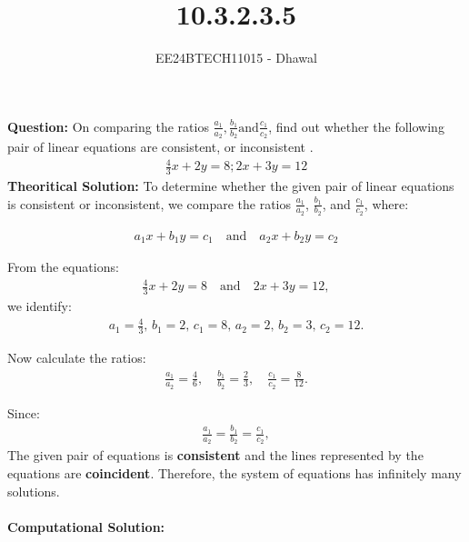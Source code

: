 \documentclass[journal]{IEEEtran}
\begin{document}

\vspace{3cm}

\title{10.3.2.3.5}
\author{EE24BTECH11015 - Dhawal}

{\let\newpage\relax\maketitle}

\renewcommand{\thefigure}{\theenumi}
\renewcommand{\thetable}{\theenumi}
\setlength{\intextsep}{10pt} %

\textbf{Question:}
	\newline
	On comparing the ratios $\frac{a_1}{a_2},\frac{b_1}{b_2} \text{and} \frac{c_1}{c_2}$, find out whether the following pair of linear equations are consistent, or inconsistent . 
	\begin{align}
		\frac{4}{3}x + 2y = 8 ; 2x + 3y = 12
	\end{align}
	\textbf{Theoritical Solution:}
	To determine whether the given pair of linear equations is consistent or inconsistent, we compare the ratios $\frac{a_1}{a_2}$, $\frac{b_1}{b_2}$, and $\frac{c_1}{c_2}$, where:
	
	\begin{align}
		a_1x + b_1y = c_1 \quad \text{and} \quad a_2x + b_2y = c_2
	\end{align}
	
	From the equations:
	\begin{align}
		\frac{4}{3}x + 2y = 8 \quad \text{and} \quad  2x + 3y = 12,
	\end{align}
	we identify:
	\begin{align}
		a_1 = \frac{4}{3}, \, b_1 = 2, \, c_1 = 8, \, a_2 = 2, \, b_2 = 3, \, c_2 = 12.
	\end{align}
	
	Now calculate the ratios:
	\begin{align}
		\frac{a_1}{a_2} = \frac{4}{6}, \quad \frac{b_1}{b_2} = \frac{2}{3}, \quad \frac{c_1}{c_2} = \frac{8}{12}.
	\end{align}
	
	Since:
	\begin{align}
		\frac{a_1}{a_2} = \frac{b_1}{b_2}=\frac{c_1}{c_2},
	\end{align}
	The given pair of equations is \textbf{consistent} and the lines represented by the equations are \textbf{coincident}. Therefore, the system of equations has infinitely many solutions.\\\\
	\textbf{Computational Solution:}
	\newline
\end{document}
